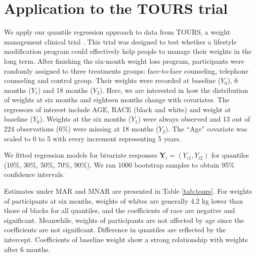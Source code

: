 \documentclass[useAMS,usenatbib,referee]{biom}
\begin{document}
\section{Application to the TOURS trial}
\label{ch3:sec:real}
We apply our quantile regression approach to data from TOURS, a weight
management clinical trial \citep{perri2008extended}.  This trial was
designed to test whether a lifestyle modification program could
effectively help people to manage their weights in the long
term. After finishing the six-month weight loss program, participants
were randomly assigned to three treatments groups: face-to-face
counseling, telephone counseling and control group. Their weights were
recorded at baseline ($Y_0$), 6 months ($Y_1$) and 18 months
($Y_2$). Here, we are interested in how the distribution of weights at
six months and eighteen months change with covariates. The
regressors of interest include AGE, RACE (black and white) and weight
at baseline ($Y_0$). Weights at the six months ($Y_1$) were always
observed and 13 out of 224 observations (6\%) were missing at 18
months ($Y_2$). The ``Age'' covariate was scaled to 0 to 5 with every
increment representing 5 years.

We fitted regression models for bivariate responses $\bm Y_i =
(Y_{i1}, Y_{i2})$ for quantiles (10\%, 30\%, 50\%, 70\%, 90\%).  We
ran 1000 bootstrap samples to obtain 95\% confidence intervals.

Estimates under MAR and MNAR are presented in Table \ref{tab:tours}.
For weights of participants at six months, weights of whites are generally 4.2 kg lower than those of blacks for all quantiles, and the coefficients of race are negative and significant.
Meanwhile, weights of participants are not affected by age since the coefficients are not significant.
Difference in quantiles are reflected by the intercept.
Coefficients of baseline weight show a strong relationship with weights after 6 months.
\end{document}
